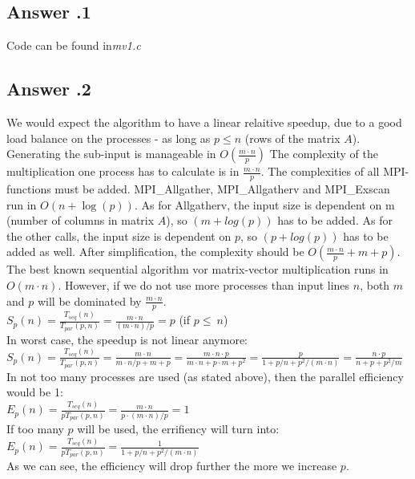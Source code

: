 \documentclass[a4paper,%
11pt,%
DIV=12,
headsepline,%
headings=normal,
]{scrartcl}
\newcounter{curex}
\newcommand{\answer}[1]{\subsection*{Answer \arabic{curex}.#1}}
\begin{document}
\answer{1}
Code can be found in\textit{mv1.c}

\answer{2}
We would expect the algorithm to have a linear relaitive speedup, due to a good load balance on the processes - as long as $p \leq n$  (rows of the matrix $A$). Generating the sub-input is manageable in $O\left(\frac{m \cdot n}{p}\right)$ The complexity of the multiplication one process has to calculate is in $\frac{m \cdot n}{p}$. The complexities of all MPI-functions must be added. MPI\_Allgather,  MPI\_Allgatherv and MPI\_Exscan run in $O(n + \log(p))$. As for Allgatherv, the input size is dependent on m (number of columns in matrix $A$), so $(m + log(p))$ has to be added. As for the other calls, the input size is dependent on $p$, so $(p + log(p))$ has to be added as well. After simplification, the complexity should be $O\left(\frac{m \cdot n}{p} + m + p\right)$.\\
\newpage
\noindent The best known sequential algorithm vor matrix-vector multiplication runs in $O(m \cdot n)$. However, if we do not use more processes than input lines $n$, both $m$ and $p$ will be dominated by $\frac{m \cdot n}{p}$.
\\[0.5 em]
$S_{p}(n)=\frac{T_{seq}(n)}{T_{par}(p,n)} = \frac{m \cdot n}{(m \cdot n)/p } = p$ (if $p \leq\ n$)
\\[0.5 em]
In worst case, the speedup is not linear anymore:
\\[0.5 em]
$\displaystyle S_{p}(n)=\frac{T_{seq}(n)}{T_{par}(p,n)} = \frac{m \cdot n}{m \cdot n/p + m + p} = \frac{m \cdot n \cdot p}{m \cdot n + p \cdot  m + p^2} = \frac{p}{1 + p/n + p^2/(m \cdot n)} = \frac{n \cdot p}{n + p + p^2/m}$
\\[0.5 em]
In not too many processes are used (as stated above), then the parallel efficiency would be 1:
\\[0.5 em]
$\displaystyle E_{p}(n)=\frac{T_{seq}(n)}{pT_{par}(p,n)} = \frac{m \cdot n}{p \cdot (m \cdot n)/p} = 1$
\\[0.5 em]
If too many $p$ will be used, the errifiency will turn into:
\\[0.5 em]
$\displaystyle E_{p}(n)=\frac{T_{seq}(n)}{pT_{par}(p,n)} = \frac{1}{1 + p/n + p^2/(m \cdot n)}$
\\[0.5 em]
As we can see, the efficiency will drop further the more we increase $p$.
\end{document}
